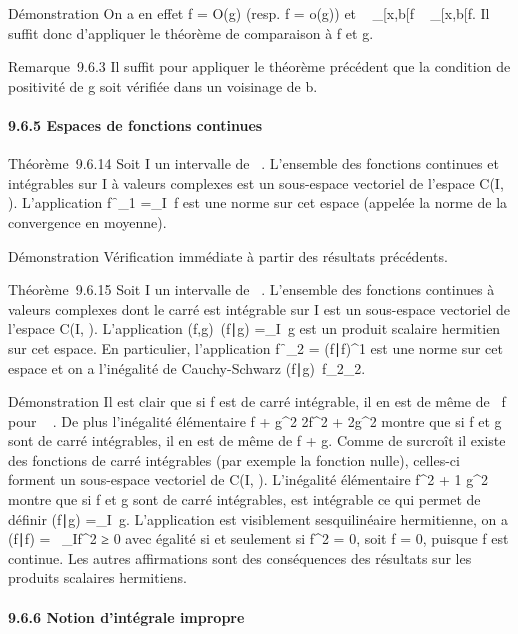 \documentclass[]{article}
\begin{document}
Démonstration On a en effet f = O(g) (resp.
f = o(g)) et \left
\int ~
_[x,b[f\right
\leq\int ~
_[x,b[f. Il suffit donc d'appliquer le
théorème de comparaison à f et g.

Remarque~9.6.3 Il suffit pour appliquer le théorème précédent que la
condition de positivité de g soit vérifiée dans un voisinage de b.

\paragraph{9.6.5 Espaces de fonctions continues}

Théorème~9.6.14 Soit I un intervalle de ~. L'ensemble des fonctions
continues et intégrables sur I à valeurs complexes est un sous-espace
vectoriel de l'espace C(I, ). L'application
f\mapsto~\f_1
=\int  _I~f est une
norme sur cet espace (appelée la norme de la convergence en moyenne).

Démonstration Vérification immédiate à partir des résultats précédents.

Théorème~9.6.15 Soit I un intervalle de ~. L'ensemble des fonctions
continues à valeurs complexes dont le carré est intégrable sur I est un
sous-espace vectoriel de l'espace C(I, ). L'application
(f,g)\mapsto~(f\mathrel∣g)
=\int  _I\overlinef~g
est un produit scalaire hermitien sur cet espace. En particulier,
l'application
f\mapsto~\f_2
= (f∣f)^1 est une norme sur cet
espace et on a l'inégalité de Cauchy-Schwarz
(f∣g)\leq\
f_2\g_2.

Démonstration Il est clair que si f est de carré intégrable, il en est
de même de \alpha~f pour \alpha~ \in \mathbb{C}. De plus l'inégalité élémentaire f +
g^2 \leq 2f^2 +
2g^2 montre que si f et g sont de carré
intégrables, il en est de même de f + g. Comme de surcroît il existe des
fonctions de carré intégrables (par exemple la fonction nulle),
celles-ci forment un sous-espace vectoriel de C(I, ). L'inégalité
élémentaire \overlinefg\leq 1
 f^2 + 1
\over 2 g^2 montre que
si f et g sont de carré intégrables, \overlinegf est
intégrable ce qui permet de définir (f∣g)
=\int  _I\overlinef~g.
L'application est visiblement sesquilinéaire hermitienne, on a
(f∣f) =\int ~
_If^2 ≥ 0 avec égalité si et
seulement si f^2 = 0, soit f = 0, puisque
f est continue. Les autres affirmations sont des conséquences des
résultats sur les produits scalaires hermitiens.

\paragraph{9.6.6 Notion d'intégrale impropre}
\end{document}
